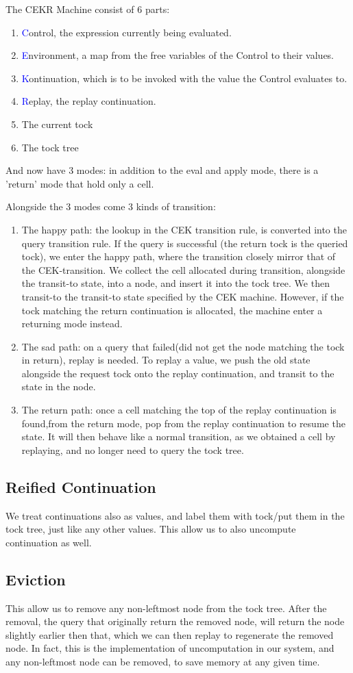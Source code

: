 The CEKR Machine consist of 6 parts:
\begin{enumerate}
	\item \textcolor{blue}{C}ontrol, the expression currently being evaluated.
	\item \textcolor{blue}{E}nvironment, a map from the free variables of the Control to their values.
	\item \textcolor{blue}{K}ontinuation, which is to be invoked with the value the Control evaluates to.
	\item \textcolor{blue}{R}eplay, the replay continuation.
	\item The current tock
	\item The tock tree
\end{enumerate}
And now have 3 modes: in addition to the eval and apply mode, there is a 'return' mode that hold only a cell.

Alongside the 3 modes come 3 kinds of transition:
\begin{enumerate}
	\item The happy path: the lookup in the CEK transition rule, is converted into the query transition rule. If the query is successful (the return tock is the queried tock), we enter the happy path, where the transition closely mirror that of the CEK-transition. We collect the cell allocated during transition, alongside the transit-to state, into a node, and insert it into the tock tree. We then transit-to the transit-to state specified by the CEK machine. However, if the tock matching the return continuation is allocated, the machine enter a returning mode instead.
	\item The sad path: on a query that failed(did not get the node matching the tock in return), replay is needed. To replay a value, we push the old state alongside the request tock onto the replay continuation, and transit to the state in the node.
	\item The return path: once a cell matching the top of the replay continuation is found,from the return mode, pop from the replay continuation to resume the state. It will then behave like a normal transition, as we obtained a cell by replaying, and no longer need to query the tock tree. 
\end{enumerate}

\subsection{Reified Continuation}
We treat continuations also as values, and label them with tock/put them in the tock tree, just like any other values. This allow us to also uncompute continuation as well.

\subsection{Eviction}
This allow us to remove any non-leftmost node from the tock tree. After the removal, the query that originally return the removed node, will return the node slightly earlier then that, which we can then replay to regenerate the removed node. In fact, this is the implementation of uncomputation in our system, and any non-leftmost node can be removed, to save memory at any given time.